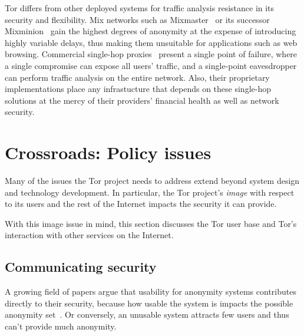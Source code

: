 \documentclass{llncs}
\begin{document}
Tor differs from other deployed systems for traffic analysis resistance
in its security and flexibility.  Mix networks such as
Mixmaster~\cite{mixmaster-spec} or its successor Mixminion~\cite{minion-design}
gain the highest degrees of anonymity at the expense of introducing highly
variable delays, thus making them unsuitable for applications such as web
browsing.  Commercial single-hop
proxies~\cite{anonymizer} present a single point of failure, where
a single compromise can expose all users' traffic, and a single-point
eavesdropper can perform traffic analysis on the entire network.
Also, their proprietary implementations place any infrastucture that
depends on these single-hop solutions at the mercy of their providers'
financial health as well as network security.



\section{Crossroads: Policy issues}
\label{sec:crossroads-policy}

Many of the issues the Tor project needs to address extend beyond
system design and technology development. In particular, the
Tor project's \emph{image} with respect to its users and the rest of
the Internet impacts the security it can provide.

With this image issue in mind, this section discusses the Tor user base and
Tor's interaction with other services on the Internet.

\subsection{Communicating security}

A growing field of papers argue that usability for anonymity systems
contributes directly to their security, because how usable the system
is impacts the possible anonymity set~\cite{back01,econymics}. Or
conversely, an unusable system attracts few users and thus can't provide
much anonymity.
\end{document}

